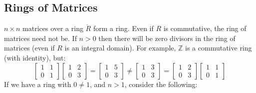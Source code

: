 \documentclass{book}                                                           %
\begin{document}
        \subsection{Rings of Matrices}
            $n\times{n}$ matrices over a ring $\ring{R}$ form a ring. Even
            if $R$ is commutative, the ring of matrices need not be. If
            $n>0$ then there will be zero divisors in the ring of matrices
            (even if $R$ is an integral domain). For example,
            $\mathbb{Z}$ is a commutative ring (with identity), but:
            \begin{equation}
                \begin{bmatrix}
                    1&1\\
                    0&1
                \end{bmatrix}
                \begin{bmatrix}
                    1&2\\
                    0&3
                \end{bmatrix}
                =
                \begin{bmatrix}
                    1&5\\
                    0&3
                \end{bmatrix}
                \ne
                \begin{bmatrix}
                    1&3\\
                    0&3
                \end{bmatrix}
                =
                \begin{bmatrix}
                    1&2\\
                    0&3
                \end{bmatrix}
                \begin{bmatrix}
                    1&1\\
                    0&1
                \end{bmatrix}
            \end{equation}
            If we have a ring with $0\ne{1}$, and $n>1$, consider the
            following:
\end{document}
